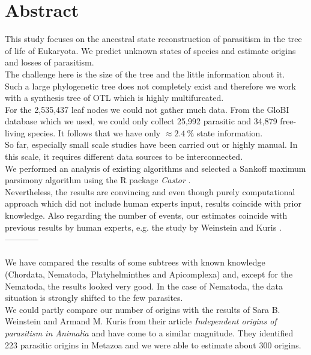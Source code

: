\chapter*{Abstract}
  This study focuses on the ancestral state reconstruction of parasitism in the tree of life of
    Eukaryota. We predict unknown states of species and estimate origins and losses of parasitism. \\
  The challenge here is the size of the tree and the little information about it. \\
  Such a large phylogenetic tree does not completely exist and therefore we work with a synthesis 
    tree of OTL \cite{Hinchliff2015} which is highly multifurcated. \\
  For the 2,535,437 leaf nodes we could not gather much data. From the GloBI database 
    \cite{Poelen2014} which we used, we could only collect 25,992 parasitic and 34,879 
    free-living species. It follows that we have only $\approx 2.4~\%$ state information. \\
  So far, especially small scale studies have been carried out or highly manual. In this scale, it 
    requires different data sources to be interconnected. \\
  We performed an analysis of existing algorithms and selected a Sankoff maximum parsimony algorithm 
    using the R package \textit{Castor} \cite{Louca2017}. \\
  Nevertheless, the results are convincing and even though purely computational approach which did 
    not include human experts input, results coincide with prior knowledge. Also regarding the number 
    of events, our estimates coincide with previous results by human experts, e.g. the study by 
    Weinstein and Kuris \cite{Weinstein2016}. \\

  ------------ \\

   \\
  We have compared the results of some subtrees with known knowledge (Chordata, Nematoda, 
    Platyhelminthes and Apicomplexa) and, except for the Nematoda, the results looked very good. In 
    the case of Nematoda, the data situation is strongly shifted to the few parasites. \\
  We could partly compare our number of origins with the results of Sara B. Weinstein and Armand M. 
  Kuris from their article \textit{Independent origins of parasitism in Animalia}  
    and have come to a similar magnitude. They identified 223 parasitic origins in Metazoa and we 
    were able to estimate about 300 origins. \\

